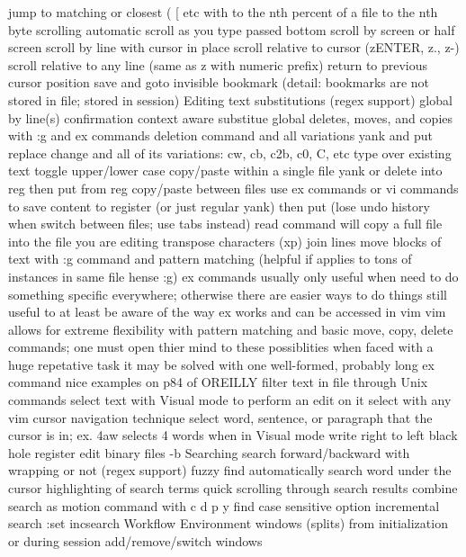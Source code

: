 \documentclass[12pt]{book}
\begin{document}
    jump to matching or closest ( { [ etc with %
    to the nth percent of a file 
    to the nth byte
  scrolling
    automatic scroll as you type passed bottom
    scroll by screen or half screen
    scroll by line with cursor in place
    scroll relative to cursor (zENTER, z., z-)
    scroll relative to any line (same as z with numeric prefix)
  return to previous cursor position
  save and goto invisible bookmark (detail: bookmarks are not stored in file; stored in session)
Editing text
  substitutions (regex support)
    global
    by line(s)
    confirmation
    context aware substitue
  global deletes, moves, and copies with :g and ex commands
  deletion command and all variations
  yank and put
  replace
    change and all of its variations: cw, cb, c2b, c0, C, etc 
    type over existing text
  toggle upper/lower case
  copy/paste within a single file
    yank or delete into reg then put from reg
  copy/paste between files
    use ex commands or vi commands to save content to register (or just regular yank) then put (lose undo history when switch between files; use tabs instead)
    read command will copy a full file into the file you are editing
  transpose characters (xp)
  join lines
  move blocks of text
    with :g command and pattern matching (helpful if applies to tons of instances in same file hense :g)
  ex commands
    usually only useful when need to do something specific everywhere; otherwise there are easier ways to do things
    still useful to at least be aware of the way ex works and can be accessed in vim
    vim allows for extreme flexibility with pattern matching and basic move, copy, delete commands; one must open thier mind to these possiblities when faced with a huge repetative task
    it may be solved with one well-formed, probably long ex command
    nice examples on p84 of OREILLY
  filter text in file through Unix commands
  select text with Visual mode to perform an edit on it
    select with any vim cursor navigation technique
    select word, sentence, or paragraph that the cursor is in; ex. 4aw selects 4 words when in Visual mode
  write right to left
  black hole register
  edit binary files -b
Searching
  search forward/backward with wrapping or not (regex support)
  fuzzy find
  automatically search word under the cursor
  highlighting of search terms
  quick scrolling through search results
  combine search as motion command with c d p y
  find
  case sensitive option
  incremental search :set incsearch
Workflow
  Environment
    windows (splits)
      from initialization or during session
      add/remove/switch windows
}
\end{document}
